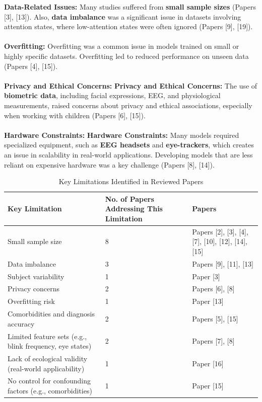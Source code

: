 \documentclass[12pt]{article}
\begin{document}
\textbullet \textbf{Data-Related Issues:} Many studies suffered from \textbf{small sample sizes} (Papers [3], [13]). Also, \textbf{data imbalance} was a significant issue in datasets involving attention states, where low-attention states were often ignored (Papers [9], [19]). \\ \\ 
\textbullet \textbf{Overfitting:} Overfitting was a common issue in models trained on small or highly specific datasets. Overfitting led to reduced performance on unseen data (Papers [4], [15]).  \\ \\
\textbullet \textbf{Privacy and Ethical Concerns:} \textbf{Privacy and Ethical Concerns:} The use of \textbf{biometric data}, including facial expressions, EEG, and physiological measurements, raised concerns about privacy and ethical associations, especially when working with children (Papers [6], [15]).  \\ \\
\textbullet \textbf{Hardware Constraints:} \textbf{Hardware Constraints:} Many models required specialized equipment, such as \textbf{EEG headsets} and \textbf{eye-trackers}, which creates an issue in scalability in real-world applications. Developing models that are less reliant on expensive hardware was a key challenge (Papers [8], [14]). \\ 

\begin{table}[H]
\centering
\caption{Key Limitations Identified in Reviewed Papers}
\begin{tabular}{|p{}|p{}|p{}|}
\hline
\textbf{Key Limitation} & \textbf{No. of Papers Addressing This Limitation} & \textbf{Papers} \\
\hline
Small sample size & 8 & Papers [2], [3], [4], [7], [10], [12], [14], [15] \\
\hline
Data imbalance & 3 & Papers [9], [11], [13] \\
\hline
Subject variability & 1 & Paper [3] \\
\hline
Privacy concerns & 2 & Papers [6], [8] \\
\hline
Overfitting risk & 1 & Paper [13] \\
\hline
Comorbidities and diagnosis accuracy & 2 & Papers [5], [15] \\
\hline
Limited feature sets (e.g., blink frequency, eye states) & 2 & Papers [7], [8] \\
\hline
Lack of ecological validity (real-world applicability) & 1 & Paper [16] \\
\hline
No control for confounding factors (e.g., comorbidities) & 1 & Paper [15] \\
\hline
\end{tabular}
\end{table}
\end{document}
